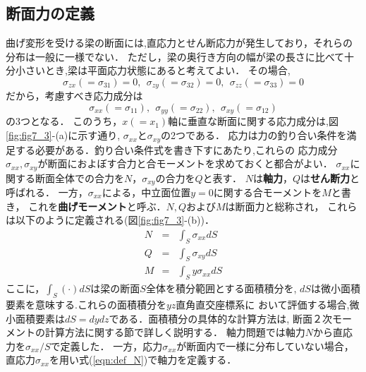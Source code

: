 \documentclass[10pt,a4j]{jbook}
\begin{document}
\subsection{断面力の定義}
曲げ変形を受ける梁の断面には,直応力とせん断応力が発生しており，それらの分布は一般に一様でない．
ただし，梁の奥行き方向の幅が梁の長さに比べて十分小さいとき,梁は平面応力状態にあると考えてよい．
その場合,
\begin{equation}
	\sigma_{zx}(=\sigma_{31})=0, \ \ 
	\sigma_{zy}(=\sigma_{32})=0, \ \ 
	\sigma_{zz}(=\sigma_{33})=0
\end{equation}
だから，考慮すべき応力成分は
\begin{equation}
	\sigma_{xx}(=\sigma_{11}), \ \ 
	\sigma_{yy}(=\sigma_{22}), \ \ 
	\sigma_{xy}(=\sigma_{12})
\end{equation}
の3つとなる．
このうち，$x(=x_1)$軸に垂直な断面に関する応力成分は,図\ref{fig:fig7_3}-(a)に示す通り,
$\sigma_{xx}$と$\sigma_{xy}$の2つである．
応力は力の釣り合い条件を満足する必要がある．釣り合い条件式を書き下すにあたり,これらの
応力成分$\sigma_{xx},\sigma_{xy}$が断面におよぼす合力と合モーメントを求めておくと都合がよい．
$\sigma_{xx}$に関する断面全体での合力を$N$，$\sigma_{xy}$の合力を$Q$と表す．
$N$は{\bf 軸力}，$Q$は{\bf せん断力}と呼ばれる．
一方，$\sigma_{xx}$による，中立面位置$y=0$に関する合モーメントを$M$と書き，
これを{\bf 曲げモーメント}と呼ぶ．$N,Q$および$M$は断面力と総称され，
これらは以下のように定義される(図\ref{fig:fig7_3}-(b))．
\begin{eqnarray}
	N &=& \int_S \sigma_{xx} dS 
	\label{eqn:def_N}\\
	Q &=& \int_S \sigma_{xy} dS
	\label{eqn:def_Q}\\
	M &=& \int_S y\sigma_{xx} dS
	\label{eqn:def_M}
\end{eqnarray}
ここに，$\int_S(\cdot)dS$は梁の断面$S$全体を積分範囲とする面積積分を, 
$dS$は微小面積要素を意味する.これらの面積積分を$yz$直角直交座標系に
おいて評価する場合,微小面積要素は$dS=dydz$である．面積積分の具体的な計算方法は,
断面２次モーメントの計算方法に関する節で詳しく説明する．
軸力問題では軸力$N$から直応力を$\sigma_{xx}/S$で定義した．
一方，応力$\sigma_{xx}$が断面内で一様に分布していない場合，
直応力$\sigma_{xx}$を用い式(\ref{eqn:def_N})で軸力を定義する．
\end{document}
